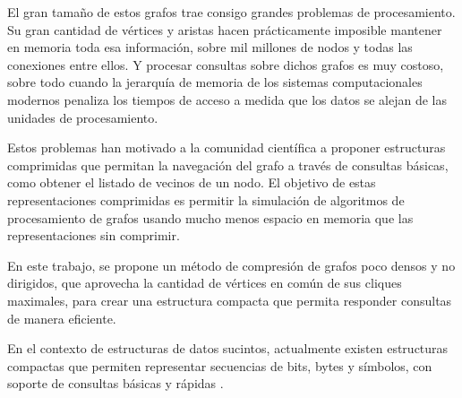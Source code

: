 El gran tamaño de estos grafos trae consigo grandes problemas de procesamiento. Su gran cantidad de vértices y aristas hacen prácticamente imposible mantener en memoria toda esa información, sobre mil millones de nodos y todas las conexiones entre ellos. Y procesar consultas sobre dichos grafos es muy costoso, sobre todo cuando la jerarquía de memoria de los sistemas computacionales modernos penaliza los tiempos de acceso a medida que los datos se alejan de las unidades de procesamiento.

Estos problemas han motivado a la comunidad científica a proponer estructuras comprimidas que permitan la navegación del grafo a través de consultas básicas, como obtener el listado de vecinos de un nodo. El objetivo de estas representaciones comprimidas es permitir la simulación de algoritmos de procesamiento de grafos usando mucho menos espacio en memoria que las representaciones sin comprimir.

En este trabajo, se propone un método de compresión de grafos poco densos y no dirigidos, que aprovecha la cantidad de vértices en común de sus cliques maximales, para crear una estructura compacta que permita responder consultas de manera eficiente.

En el contexto de estructuras de datos sucintos, actualmente existen estructuras compactas que permiten representar secuencias de bits, bytes y símbolos, con soporte de consultas básicas y rápidas \cite{raman2002succinct, grossi2003high, claude2015wavelet}.



